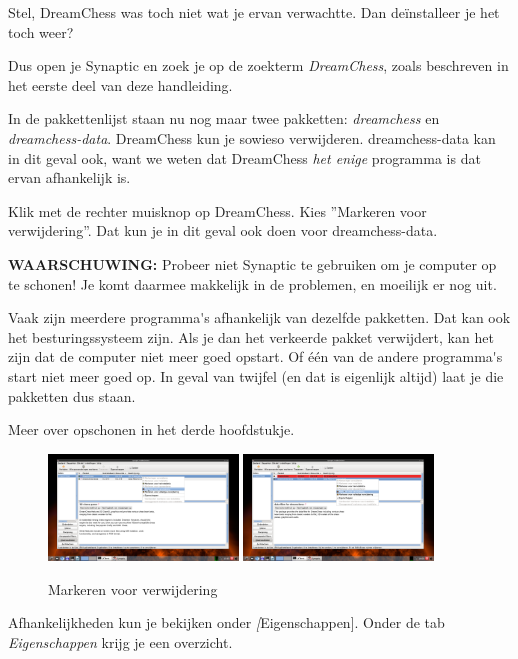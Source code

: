 \documentclass[12pt,a4paper]{article}
\begin{document}
Stel, DreamChess was toch niet wat je ervan verwachtte. Dan de\"{i}nstalleer je het toch weer?

Dus open je Synaptic en zoek je op de zoekterm \emph{DreamChess}, zoals beschreven in het eerste deel van deze handleiding. 

In de pakkettenlijst staan nu nog maar twee pakketten: \emph{dreamchess} en \emph{dreamchess-data}. DreamChess kun je sowieso verwijderen. dreamchess-data kan in dit geval ook, want we weten dat DreamChess \emph{het enige} programma is dat ervan afhankelijk is. 

Klik met de rechter muisknop op DreamChess. Kies ''Markeren voor verwijdering''. Dat kun je in dit geval ook doen voor dreamchess-data. 


\textbf{WAARSCHUWING:} Probeer niet Synaptic te gebruiken om je computer op te schonen! Je komt daarmee makkelijk in de problemen, en moeilijk er nog uit. 

Vaak zijn meerdere programma\'{}s afhankelijk van dezelfde pakketten. Dat kan ook het besturingssysteem zijn. Als je dan het verkeerde pakket verwijdert, kan het zijn dat de computer niet meer goed opstart. Of \'{e}\'{e}n van de andere programma\'{}s start niet meer goed op. In geval van twijfel (en dat is eigenlijk altijd) laat je die pakketten dus staan. 

Meer over opschonen in het derde hoofdstukje.

\begin{figure} [H]
\centering
\includegraphics[width=0.45\textwidth]{plaatje16}
\includegraphics[width=0.45\textwidth]{plaatje17}
\caption{Markeren voor verwijdering}
\label{plaatje16}
\end{figure}

Afhankelijkheden kun je bekijken onder \emph[Eigenschappen]. Onder de tab \emph{Eigenschappen} krijg je een overzicht.  
\end{document}
